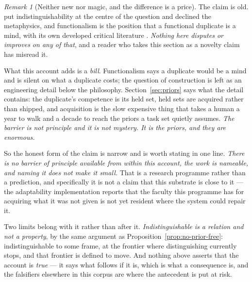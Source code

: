 \documentclass[11pt,a4paper]{article}
\theoremstyle{remark}
\newtheorem{remark}[definition]{Remark}
\begin{document}
\begin{remark}[Neither new nor magic, and the difference is a price]\label{rem:persons}
The claim is old. \citet{turing1950} put indistinguishability at the centre of the question and
declined the metaphysics, and functionalism \citep{putnam1967} is the position that a functional
duplicate is a mind, with its own developed critical literature \citep{block1972}. \emph{Nothing here
disputes or improves on any of that}, and a reader who takes this section as a novelty claim has
misread it.

What this account adds is a \emph{bill}. Functionalism says a duplicate would be a mind and is silent
on what a duplicate costs; the question of construction is left as an engineering detail below the
philosophy. Section~\ref{sec:priors} says what the detail contains: the duplicate's competence is its
held set, held sets are acquired rather than shipped, and acquisition is the slow expensive thing that
takes a human a year to walk and a decade to reach the priors a task set quietly assumes. \emph{The
barrier is not principle and it is not mystery. It is the priors, and they are enormous.}

So the honest form of the claim is narrow and is worth stating in one line. \emph{There is no barrier
of principle available from within this account, the work is nameable, and naming it does not make it
small.} That is a research programme rather than a prediction, and specifically it is not a claim that
this substrate is close to it --- the adaptability implementation reports that the faculty this programme has for
acquiring what it was not given is not yet resident where the system could repair it.

Two limits belong with it rather than after it. \emph{Indistinguishable is a relation and not a
property}, by the same argument as Proposition~\ref{prop:no-prior-free}: indistinguishable to some
frame, at the frontier where distinguishing currently stops, and that frontier is defined to move. And
nothing above asserts that the account is \emph{true} --- it says what follows if it is, which is what a
consequence is, and the falsifiers elsewhere in this corpus are where the antecedent is put at risk.
\end{remark}
\end{document}

